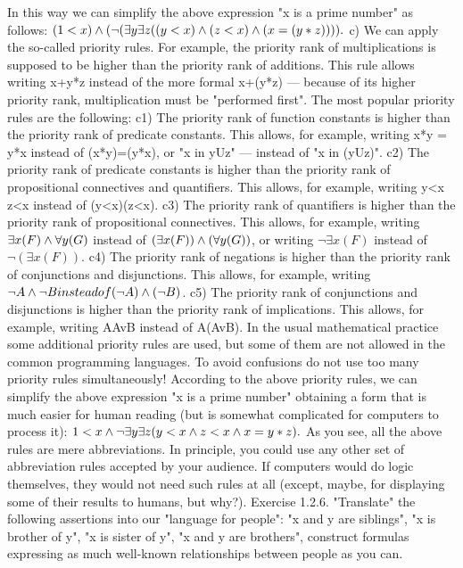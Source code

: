 In this way we can simplify the above expression "x is a prime number" as follows:
\((1<x)\wedge (\neg (\exists y\exists z((y<x)\wedge (z<x)\wedge (x=(y*z)))).\)
c) We can apply the so-called priority rules. For example, the priority rank of multiplications is supposed
to be higher than the priority rank of additions. This rule allows writing x+y*z instead of the more formal
x+(y*z) --- because of its higher priority rank, multiplication must be "performed first". The most popular
priority rules are the following:
c1) The priority rank of function constants is higher than the priority rank of predicate constants. This
allows, for example, writing x*y = y*x instead of (x*y)=(y*x), or "x in yUz" --- instead of "x in (yUz)".
c2) The priority rank of predicate constants is higher than the priority rank of propositional connectives
and quantifiers. This allows, for example, writing y<x \AND  z<x instead of (y<x)\AND (z<x).
c3) The priority rank of quantifiers is higher than the priority rank of propositional connectives. This
allows, for example, writing \(\exists x(F)\wedge \forall y(G)\) instead of \((\exists x(F))\wedge (\forall y(G))\), or writing \(\neg \exists x(F)\) instead of \(\neg (\exists x(F))\).
c4) The priority rank of negations is higher than the priority rank of conjunctions and disjunctions. This allows, for example, writing \(\neg A\wedge \neg B instead of (\neg A)\wedge (\neg B)\).
c5) The priority rank of conjunctions and disjunctions is higher than the priority rank of implications.
This allows, for example, writing A\IMPLIES AvB instead of A\IMPLIES (AvB).
In the usual mathematical practice some additional priority rules are used, but some of them are not
allowed in the common programming languages. To avoid confusions do not use too many priority rules
simultaneously!
According to the above priority rules, we can simplify the above expression "x is a prime number"
obtaining a form that is much easier for human reading (but is somewhat complicated for computers to
process it):
\(1<x \wedge  \neg \exists y\exists z(y<x \wedge  z<x \wedge  x=y*z).\)
As you see, all the above rules are mere abbreviations. In principle, you could use any other set of
abbreviation rules accepted by your audience. If computers would do logic themselves, they would not
need such rules at all (except, maybe, for displaying some of their results to humans, but why?).
Exercise 1.2.6. "Translate" the following assertions into our "language for people":
"x and y are siblings",
"x is brother of y", "x is sister of y",
"x and y are brothers",
construct formulas expressing as much well-known relationships between people as you can.
